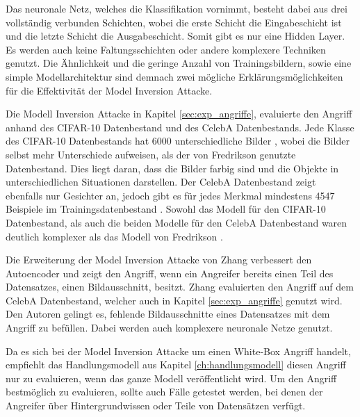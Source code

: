 Das neuronale Netz, welches die Klassifikation vornimmt, besteht dabei aus drei vollständig verbunden Schichten, wobei die erste Schicht die Eingabeschicht ist und die letzte Schicht die Ausgabeschicht. 
Somit gibt es nur eine Hidden Layer. 
Es werden auch keine Faltungsschichten oder andere komplexere Techniken genutzt.
Die Ähnlichkeit und die geringe Anzahl von Trainingsbildern, sowie eine simple Modellarchitektur sind demnach zwei mögliche Erklärungsmöglichkeiten für die Effektivität der Model Inversion Attacke.

Die Modell Inversion Attacke in Kapitel \ref{sec:exp_angriffe}, evaluierte den Angriff anhand des CIFAR-10 Datenbestand und des CelebA Datenbestands.
Jede Klasse des CIFAR-10 Datenbestands hat 6000 unterschiedliche Bilder \cite{cifar10}, wobei die Bilder selbst mehr Unterschiede aufweisen, als der von Fredrikson \etal genutzte Datenbestand.
Dies liegt daran, dass die Bilder farbig sind und die Objekte in unterschiedlichen Situationen darstellen.
Der CelebA Datenbestand zeigt ebenfalls nur Gesichter an, jedoch gibt es für jedes Merkmal mindestens 4547 Beispiele im Trainingsdatenbestand \cite{celeba}.
Sowohl das Modell für den CIFAR-10 Datenbestand, als auch die beiden Modelle für den CelebA Datenbestand waren deutlich komplexer als das Modell von Fredrikson \etal \cite{P-3}.


Die Erweiterung der Model Inversion Attacke von Zhang \etal \cite{P-4} verbessert den Autoencoder und zeigt den Angriff, wenn ein Angreifer bereits einen Teil des Datensatzes, \zB einen Bildausschnitt, besitzt.
Zhang \etal \cite{P-4} evaluierten den Angriff auf dem CelebA Datenbestand, welcher auch in Kapitel \ref{sec:exp_angriffe} genutzt wird.
Den Autoren gelingt es, fehlende Bildausschnitte eines Datensatzes mit dem Angriff zu befüllen.
Dabei werden auch komplexere neuronale Netze genutzt.

Da es sich bei der Model Inversion Attacke um einen White-Box Angriff handelt, empfiehlt das Handlungsmodell aus Kapitel \ref{ch:handlungsmodell} diesen Angriff nur zu evaluieren, wenn das ganze Modell veröffentlicht wird.
Um den Angriff bestmöglich zu evaluieren, sollte auch Fälle getestet werden, bei denen der Angreifer über Hintergrundwissen oder Teile von Datensätzen verfügt.


